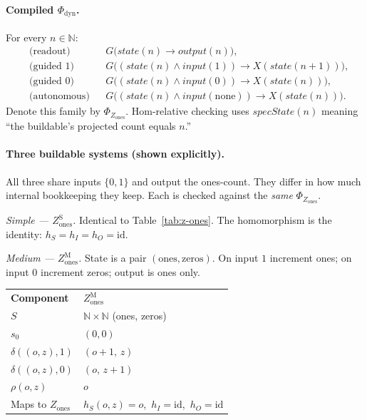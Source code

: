 \paragraph{Compiled $\Phi_{\mathrm{dyn}}$.}
For every $n\in\mathbb{N}$:
\begin{align*}
  &\text{(readout)} && G\bigl(\mathit{state}(n) \rightarrow \mathit{output}(n)\bigr), \\
  &\text{(guided $1$)} && G\bigl((\mathit{state}(n)\wedge\mathit{input}(1)) \rightarrow X(\mathit{state}(n{+}1))\bigr), \\
  &\text{(guided $0$)} && G\bigl((\mathit{state}(n)\wedge\mathit{input}(0)) \rightarrow X(\mathit{state}(n))\bigr), \\
  &\text{(autonomous)} && G\bigl((\mathit{state}(n)\wedge\mathit{input}(\mathrm{none})) \rightarrow X(\mathit{state}(n))\bigr).
\end{align*}
Denote this family by $\Phi_{Z_{\mathrm{ones}}}$. Hom-relative checking uses $\mathit{specState}(n)$ meaning ``the buildable's projected count equals $n$.''

\paragraph{Three buildable systems (shown explicitly).}
All three share inputs $\{0,1\}$ and output the ones-count. They differ in how much internal bookkeeping they keep. Each is checked against the \emph{same} $\Phi_{Z_{\mathrm{ones}}}$.

\textit{Simple --- $Z_{\mathrm{ones}}^{\mathrm{S}}$.}
Identical to Table~\ref{tab:z-ones}. The homomorphism is the identity: $h_S=h_I=h_O=\mathrm{id}$.

\textit{Medium --- $Z_{\mathrm{ones}}^{\mathrm{M}}$.}
State is a pair $(\mathrm{ones},\mathrm{zeros})$. On input $1$ increment ones; on input $0$ increment zeros; output is ones only.

\begingroup
\renewcommand{\arraystretch}{1.2}
\footnotesize
\begin{center}
\begin{tabularx}{0.78\linewidth}{@{}>{\raggedright\arraybackslash}p{2.8cm}Y@{}}
    \headingfont\bfseries Component & \headingfont\bfseries $Z_{\mathrm{ones}}^{\mathrm{M}}$ \\
    \addlinespace[2pt]
    $S$ & $\mathbb{N}\times\mathbb{N}$ (ones, zeros) \\
    \addlinespace[2pt]
    $s_0$ & $(0,0)$ \\
    \addlinespace[2pt]
    $\delta((o,z),1)$ & $(o{+}1,\,z)$ \\
    \addlinespace[2pt]
    $\delta((o,z),0)$ & $(o,\,z{+}1)$ \\
    \addlinespace[2pt]
    $\rho(o,z)$ & $o$ \\
    \addlinespace[2pt]
    Maps to $Z_{\mathrm{ones}}$ & $h_S(o,z)=o$,\ $h_I=\mathrm{id}$,\ $h_O=\mathrm{id}$ \\
\end{tabularx}
\end{center}
\label{tab:z-ones-med}
\endgroup
\vspace{4pt}

